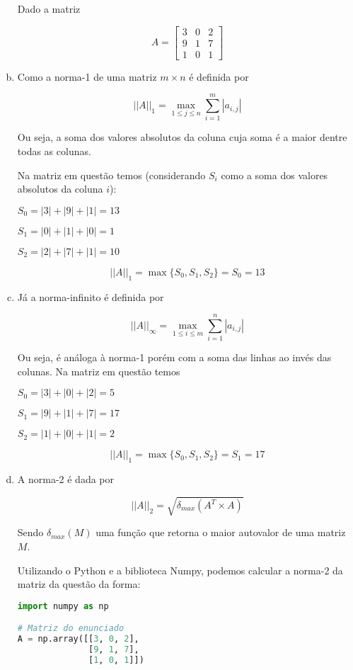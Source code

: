\documentclass[11pt]{article}
\begin{document}
\begin{exerc}
\begin{enumerate}[a.]
Dado a matriz

\[
A =
\begin{bmatrix}
    3 & 0 & 2\\
    9 & 1 & 7\\
    1 & 0 & 1
\end{bmatrix}
\]

\item
Como a norma-1 de uma matriz $m \times n$ é definida por

$$||A||_1 = \max_{1 \le j \le n} \sum_{i=1}^{m}|a_{i,j}|$$

Ou seja, a soma dos valores absolutos da coluna cuja soma é a maior dentre todas as colunas.

Na matriz em questão temos (considerando $S_i$ como a soma dos valores absolutos da coluna $i$):

$S_0 = |3| + |9| + |1| = 13$

$S_1 = |0| + |1| + |0| = 1$

$S_2 = |2| + |7| + |1| = 10$

$$||A||_1 = \max \{S_0, S_1, S_2\} = S_0 = 13$$

\item
Já a norma-infinito é definida por

$$||A||_\infty = \max_{1 \le i \le m} \sum_{i=1}^{n}|a_{i,j}|$$

Ou seja, é análoga à norma-1 porém com a soma das linhas ao invés das colunas. Na matriz em questão temos

$S_0 = |3| + |0| + |2| = 5$

$S_1 = |9| + |1| + |7| = 17$

$S_2 = |1| + |0| + |1| = 2$

$$||A||_1 = \max \{S_0, S_1, S_2\} = S_1 = 17$$

\item
A norma-2 é dada por

$$||A||_2 = \sqrt{\delta_{max}(A^T \times A)}$$

Sendo $\delta_{max}(M)$ uma função que retorna o maior autovalor de uma matriz $M$.

Utilizando o Python e a biblioteca Numpy, podemos calcular a norma-2 da matriz da questão da forma:

\begin{lstlisting}[language=Python]
import numpy as np

# Matriz do enunciado
A = np.array([[3, 0, 2],
              [9, 1, 7],
              [1, 0, 1]])


\end{lstlisting}
\end{enumerate}
\end{exerc}
\end{document}
